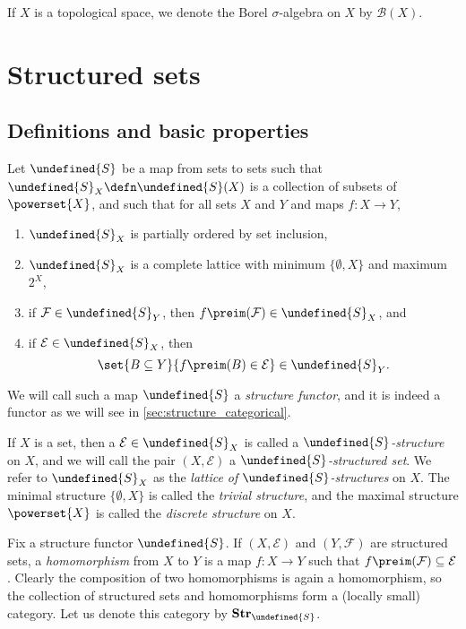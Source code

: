 \documentclass[article, a4paper, 11pt, oneside]{memoir}
\let\mathfrak\undefined
\numberwithin{equation}{chapter}
\newcommand{\calE}{\mathcal{E}}
\newcommand{\calF}{\mathcal{F}}
\newcommand{\borel}{\mathcal{B}}
\newcommand{\strucS}{\mathfrak{S}}
\newcommand{\ncat}[1]{\mathbf{#1}} %
\newcommand{\catStruc}[1]{\ncat{Str}_{#1}} %
\newcommand{\catStrucS}{\catStruc{\strucS}} %
\begin{document}
If $X$ is a topological space, we denote the Borel $\sigma$-algebra on $X$ by $\borel(X)$.



\chapter{Structured sets}


\section{Definitions and basic properties}

Let $\strucS$ be a map from sets to sets such that $\strucS_X \defn \strucS(X)$ is a collection of subsets of $\powerset{X}$, and such that for all sets $X$ and $Y$ and maps $f \colon X \to Y$,
%
\begin{enumerate}
    \item $\strucS_X$ is partially ordered by set inclusion,
    
    \item $\strucS_X$ is a complete lattice with minimum $\{\emptyset, X\}$ and maximum $2^X$,
    
    \item\label{enum:structure_def_pullback} if $\calF \in \strucS_Y$, then $f\preim(\calF) \in \strucS_X$, and
    
    \item\label{enum:structure_def_pushforward} if $\calE \in \strucS_X$, then
    \begin{equation*}
        \set{B \subseteq Y}{f\preim(B) \in \calE} \in \strucS_Y.
    \end{equation*}
\end{enumerate}
%
We will call such a map $\strucS$ a \emph{structure functor}, and it is indeed a functor as we will see in \cref{sec:structure_categorical}.

If $X$ is a set, then a $\calE \in \strucS_X$ is called a \emph{$\strucS$-structure} on $X$, and we will call the pair $(X, \calE)$ a \emph{$\strucS$-structured set}. We refer to $\strucS_X$ as the \emph{lattice of $\strucS$-structures} on $X$. The minimal structure $\{\emptyset, X\}$ is called the \emph{trivial structure}, and the maximal structure $\powerset{X}$ is called the \emph{discrete structure} on $X$.

Fix a structure functor $\strucS$. If $(X, \calE)$ and $(Y, \calF)$ are structured sets, a \emph{homomorphism} from $X$ to $Y$ is a map $f \colon X \to Y$ such that $f\preim(\calF) \subseteq \calE$. Clearly the composition of two homomorphisms is again a homomorphism, so the collection of structured sets and homomorphisms form a (locally small) category. Let us denote this category by $\catStrucS$.
\end{document}

